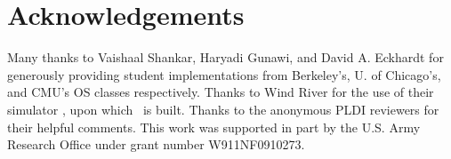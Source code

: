 \documentclass[pldi]{sigplanconf-pldi15}
\begin{document}
\section{Acknowledgements}

Many thanks to Vaishaal Shankar, Haryadi Gunawi, and David A. Eckhardt for generously providing student implementations from Berkeley's, U. of Chicago's, and CMU's OS classes respectively.
Thanks to Wind River for the use of their simulator \simics, upon which \landslide~is built.
Thanks to
the anonymous PLDI reviewers for their helpful comments.
This work was supported in part by %
the U.S. Army Research Office under grant number W911NF0910273.



{}
\end{document}
